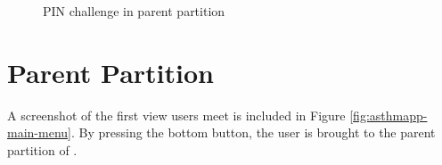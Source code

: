 \begin{figure}
\begin{minipage}[t]{0.4\linewidth}
		\caption{PIN challenge in parent partition}
		\label{fig:parent-pin}
	\end{minipage}
\end{figure}

\section{Parent Partition}
\label{sec:parentpartition}

A screenshot of the first view users meet is included in Figure \ref{fig:asthmapp-main-menu}. By pressing the bottom button, the user is brought to the parent partition of \app{}. 

